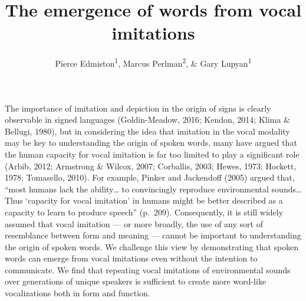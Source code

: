 \documentclass[english,floatsintext,man]{apa6}
\title{The emergence of words from vocal imitations}
\author{Pierce Edmiston\textsuperscript{1}, Marcus Perlman\textsuperscript{2}, \& Gary Lupyan\textsuperscript{1}}
\affiliation{
    \vspace{0.5cm}
          \textsuperscript{1} University of Wisconsin-Madison\\
          \textsuperscript{2} Max Planck Institute for Psycholinguistics  }
\theoremstyle{definition}
\theoremstyle{definition}
\theoremstyle{remark}
\begin{document}
\maketitle

\setcounter{secnumdepth}{0}



The importance of imitation and depiction in the origin of signs is
clearly observable in signed languages (Goldin-Meadow, 2016; Kendon,
2014; Klima \& Bellugi, 1980), but in considering the idea that
imitation in the vocal modality may be key to understanding the origin
of spoken words, many have argued that the human capacity for vocal
imitation is far too limited to play a significant role (Arbib, 2012;
Armstrong \& Wilcox, 2007; Corballis, 2003; Hewes, 1973; Hockett, 1978;
Tomasello, 2010). For example, Pinker and Jackendoff (2005) argued that,
\enquote{most humans lack the ability\ldots{} to convincingly reproduce
environmental sounds\ldots{} Thus \enquote{capacity for vocal imitation}
in humans might be better described as a capacity to learn to produce
speech} (p.~209). Consequently, it is still widely assumed that vocal
imitation --- or more broadly, the use of any sort of resemblance
between form and meaning --- cannot be important to understanding the
origin of spoken words. We challenge this view by demonstrating that
spoken words can emerge from vocal imitations even without the intention
to communicate. We find that repeating vocal imitations of environmental
sounds over generations of unique speakers is sufficient to create more
word-like vocalizations both in form and function.
\end{document}
